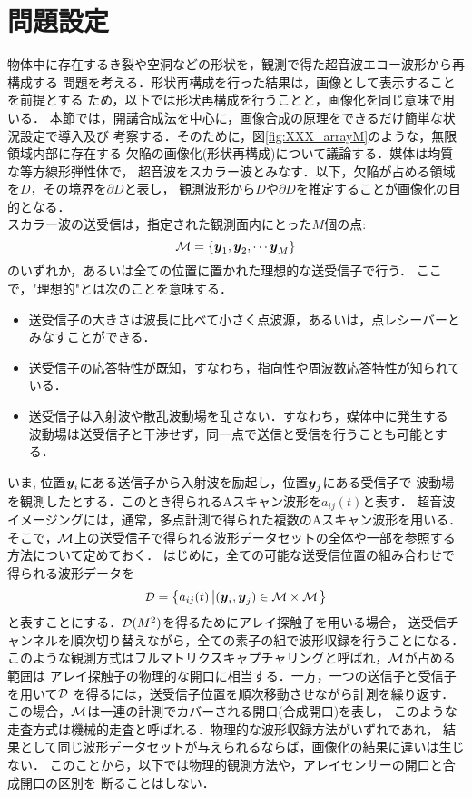 \setcounter{section}{3}
\section{問題設定}
物体中に存在するき裂や空洞などの形状を，観測で得た超音波エコー波形から再構成する
問題を考える．形状再構成を行った結果は，画像として表示することを前提とする
ため，以下では形状再構成を行うことと，画像化を同じ意味で用いる．
本節では，開講合成法を中心に，画像合成の原理をできるだけ簡単な状況設定で導入及び
考察する．そのために，図\ref{fig:XXX_arrayM}のような，無限領域内部に存在する
欠陥の画像化(形状再構成)について議論する．媒体は均質な等方線形弾性体で，
超音波をスカラー波とみなす．以下，欠陥が占める領域を$D$，その境界を$\partial D$と表し，
観測波形から$D$や$\partial D$を推定することが画像化の目的となる．\\

スカラー波の送受信は，指定された観測面内にとった$M$個の点:
\begin{equation}
	{\cal M} =\left\{ 
		\mbox{\boldmath $y$}_1, \mbox{\boldmath $y$}_2, \cdots \mbox{\boldmath $y$}_M
	\right\}
	\label{eqn:XXX_00}
\end{equation}
のいずれか，あるいは全ての位置に置かれた理想的な送受信子で行う．
ここで，"理想的"とは次のことを意味する．
\begin{itemize}
\item
送受信子の大きさは波長に比べて小さく点波源，あるいは，点レシーバーとみなすことができる．
\item
送受信子の応答特性が既知，すなわち，指向性や周波数応答特性が知られている．
\item
送受信子は入射波や散乱波動場を乱さない．すなわち，媒体中に発生する
波動場は送受信子と干渉せず，同一点で送信と受信を行うことも可能とする．
\end{itemize}
いま, 位置$\mbox{\boldmath $y$}_i$にある送信子から入射波を励起し，位置$\mbox{\boldmath $y$}_j$にある受信子で
波動場を観測したとする．このとき得られるAスキャン波形を$a_{ij}(t)$と表す．
超音波イメージングには，通常，多点計測で得られた複数のAスキャン波形を用いる．
そこで，$\cal M$上の送受信子で得られる波形データセットの全体や一部を参照する
方法について定めておく．
はじめに，全ての可能な送受信位置の組み合わせで得られる波形データを
\begin{equation}
	{\cal D} = \left\{ a_{ij}(t) \left| (\mbox{\boldmath $y$}_i,\mbox{\boldmath $y$}_j)  \in {\cal M}\times {\cal M} \right.\right\}
	\label{eqn:XXX_full_mat}
\end{equation}
と表すことにする．${\cal D}(M^2)$を得るためにアレイ探触子を用いる場合，
送受信チャンネルを順次切り替えながら，全ての素子の組で波形収録を行うことになる．
このような観測方式はフルマトリクスキャプチャリングと呼ばれ，$\cal M$が占める範囲は
アレイ探触子の物理的な開口に相当する．一方，一つの送信子と受信子を用いて${\cal D}$
を得るには，送受信子位置を順次移動させながら計測を繰り返す．
この場合，$\cal M$は一連の計測でカバーされる開口(合成開口)を表し，
このような走査方式は機械的走査と呼ばれる．物理的な波形収録方法がいずれであれ，
結果として同じ波形データセットが与えられるならば，画像化の結果に違いは生じない．
このことから，以下では物理的観測方法や，アレイセンサーの開口と合成開口の区別を
断ることはしない．

